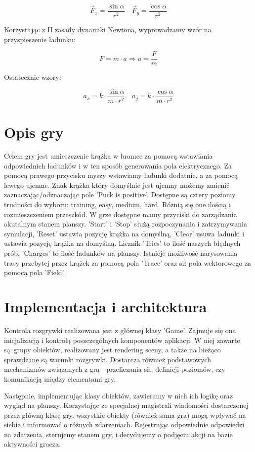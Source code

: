 \documentclass{article}
\begin{document}
$$
\vec{F}_{x}=\frac{\sin \alpha}{r^{2}} \quad \vec{F}_{y}=\frac{\cos \alpha}{r^{2}}
$$

\noindent Korzystając z II zasady dynamiki Newtona, wyprowadzamy wzór na przyspieszenie ładunku:

$$
F=m \cdot a \Rightarrow a=\frac{F}{m}
$$

\noindent Ostatecznie wzory:

$$
a_{x}=k \cdot \frac{\sin \alpha}{m \cdot r^{2}} \quad a_{y}=k \cdot \frac{\cos \alpha}{m \cdot r^{2}}
$$

\section{Opis gry}
Celem gry jest umieszczenie krążka w bramce za pomocą wstawiania odpowiednich ładunków i w ten sposób generowania pola elektrycznego. Za pomocą prawego przycisku myszy wstawiamy ładunki dodatnie, a za pomocą lewego ujemne. Znak krążka który domyślnie jest ujemny możemy zmienić zaznaczając/odznaczając pole 'Puck is positive'. Dostępne są cztery poziomy trudności do wyboru: training, easy, medium, hard. Różnią się one ilością i rozmieszczeniem przeszkód.
W grze dostępne mamy przyciski do zarządzania akutalnym stanem planszy. 'Start' i 'Stop' służą rozpoczynania i zatrzymywania symulacji, 'Reset' ustawia pozycję krążka na domyślną, 'Clear' usuwa ładunki i ustawia pozycję krążka na domyślną. Licznik 'Tries' to ilość naszych błędnych prób, 'Charges' to ilość ładunków na planszy. Istnieje możliwość narysowania trasy przebytej przez krążek za pomocą pola 'Trace' oraz sił pola wektorowego za pomocą pola 'Field'. 

\section{Implementacja i architektura}
Kontrola rozgrywki realizowana jest z głównej klasy 'Game'. Zajmuje się ona inicjalizacją i kontrolą poszczególnych komponentów aplikacji. W niej zawarte są grupy obiektów, realizowany jest rendering sceny, a także na bieżąco sprawdzane są warunki rozgrywki. Dostarcza również podstawowych mechanizmów związanych z grą - przeliczania sił, definicji poziomów, czy komunikacją między elementami gry.

Następnie, implementując klasy obiektów, zawieramy w nich ich logikę oraz wygląd na planszy. Korzystając ze specjalnej magistrali wiadomości dostarczonej przez główną klasę gry, wszystkie obiekty (również sama gra) mogą wpływać na siebie i informować o różnych zdarzeniach. Rejestrując odpowiednie odpowiedzi na zdarzenia, sterujemy stanem gry, i decydujemy o podjęciu akcji na bazie aktywności gracza.
\end{document}
